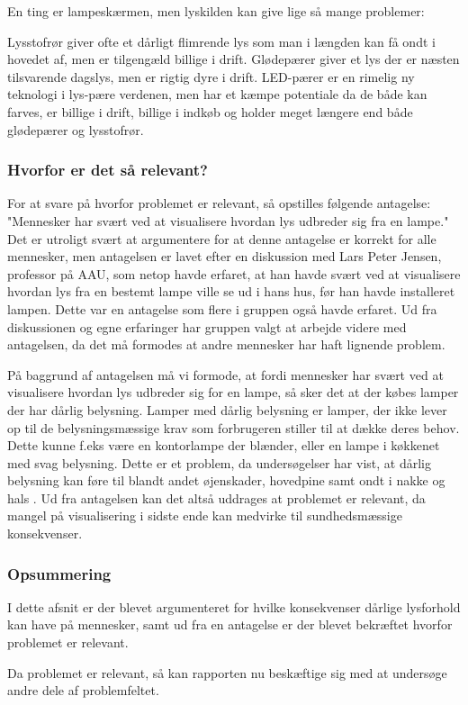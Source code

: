 En ting er lampeskærmen, men lyskilden kan give lige så mange problemer:

Lysstofrør giver ofte et dårligt flimrende lys som man i længden kan få ondt i hovedet af, men er tilgengæld billige i drift\cite{videnskab_dk_led}. Glødepærer giver et lys der er næsten tilsvarende dagslys, men er rigtig dyre i drift\cite{videnskab_dk_led}. LED-pærer er en rimelig ny teknologi i lys-pære verdenen, men har et kæmpe potentiale da de både kan farves, er billige i drift, billige i indkøb og holder meget længere end både glødepærer og lysstofrør\cite{videnskab_dk_led}.


\subsubsection{Hvorfor er det så relevant?}
\label{sec:hvorfor_relavant}

For at svare på hvorfor problemet er relevant, så opstilles følgende antagelse: "Mennesker har svært ved at visualisere hvordan lys udbreder sig fra en lampe." Det er utroligt svært at argumentere for at denne antagelse er korrekt for alle mennesker, men antagelsen er lavet efter en diskussion med Lars Peter Jensen, professor på AAU, som netop havde erfaret, at han havde svært ved at visualisere hvordan lys fra en bestemt lampe ville se ud i hans hus, før han havde installeret lampen. Dette var en antagelse som flere i gruppen også havde erfaret. Ud fra diskussionen og egne erfaringer har gruppen valgt at arbejde videre med antagelsen, da det må formodes at andre mennesker har haft lignende problem. 

På baggrund af antagelsen må vi formode, at fordi mennesker har svært ved at visualisere hvordan lys udbreder sig for en lampe, så sker det at der købes lamper der har dårlig belysning. Lamper med dårlig belysning er lamper, der ikke lever op til de belysningsmæssige krav som forbrugeren stiller til at dække deres behov. Dette kunne f.eks være en kontorlampe der blænder, eller en lampe i køkkenet med svag belysning\cite{daarlig_belysning_konsekvenser}. Dette er et problem, da undersøgelser har vist, at dårlig belysning kan føre til blandt andet øjenskader, hovedpine samt ondt i nakke og hals \cite{lys_konsekvenser}. Ud fra antagelsen kan det altså uddrages at problemet er relevant, da mangel på visualisering i sidste ende kan medvirke til sundhedsmæssige konsekvenser.

\subsubsection{Opsummering}
I dette afsnit er der blevet argumenteret for hvilke konsekvenser dårlige lysforhold kan have på mennesker, samt ud fra en antagelse er der blevet bekræftet hvorfor problemet er relevant. 

Da problemet er relevant, så kan rapporten nu beskæftige sig med at undersøge andre dele af problemfeltet. 
